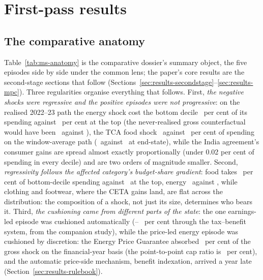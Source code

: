 \section{First-pass results}\label{sec:results}

\subsection{The comparative anatomy}\label{sec:results-anatomy}

Table~\ref{tab:ms-anatomy} is the comparative dossier's summary
object, the five episodes side by side under the common lens; the
paper's core results are the second-stage sections that follow
(Sections~\ref{sec:results-secondstage}--\ref{sec:results-mpc}). Three regularities
organise everything that follows. First, \emph{the negative shocks were regressive and the positive episodes
were not progressive}: on the realised 2022--23 path the energy shock
cost the bottom decile \MsEnergyRealisedPctSpendDecOne\ per cent of its
spending against \MsEnergyRealisedPctSpendDecTen\ per cent at the top
(the never-realised gross counterfactual would have been
\MsEnergyGrossPctSpendDecOne\ against \MsEnergyGrossPctSpendDecTen), the TCA food shock \MsTcaWindowAvgPctSpendDecOne\ against
\MsTcaWindowAvgPctSpendDecTen\ per cent of spending on the
window-average path (\MsTcaPctSpendDecOne\ against
\MsTcaPctSpendDecTen\ at end-state), while the India agreement's consumer
gains are spread almost exactly proportionally (under 0.02 per cent
of spending in every decile) and are two orders of magnitude smaller. Second,
\emph{regressivity follows the affected category's budget-share
gradient}: food takes \MsTcaBudgetSharePctDecOne\ per cent of
bottom-decile spending against \MsTcaBudgetSharePctDecTen\ at the
top, energy \MsEnergyBudgetSharePctDecOne\ against
\MsEnergyBudgetSharePctDecTen, while clothing and footwear, where
the CETA gains land, are flat across the distribution: the
composition of a shock, not just its size, determines who bears it. Third, \emph{the cushioning came
from different parts of the state}: the one earnings-led episode was
cushioned automatically (\MsUSTariffDisplacementCushionPct--%
\MsUSTariffWageCutCushionPct\ per cent through the tax--benefit
system, from the companion study), while the price-led energy episode
was cushioned by discretion: the Energy Price Guarantee absorbed
\MsEnergyCushionShareFyPct\ per cent of the gross shock on the
financial-year basis (the point-to-point cap ratio is
\MsEnergyCushionSharePct\ per cent), and the
automatic price-side mechanism, benefit indexation, arrived a year
late (Section~\ref{sec:results-rulebook}).

